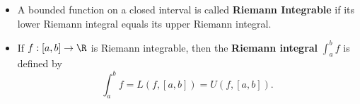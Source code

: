 \begin{definition}
    \begin{itemize}
        \item A bounded function on a closed interval is called \textbf{Riemann Integrable} if its lower Riemann integral equals its upper Riemann integral.
        \item If \( f: [a,b] \to \R  \) is Riemann integrable, then the \textbf{Riemann integral} \( \int_{ a }^{ b }  f  \) is defined by
            \[ \int_{ a }^{ b }  f = L(f,[a,b]) = U(f,[a,b]). \]
    \end{itemize}
\end{definition}
